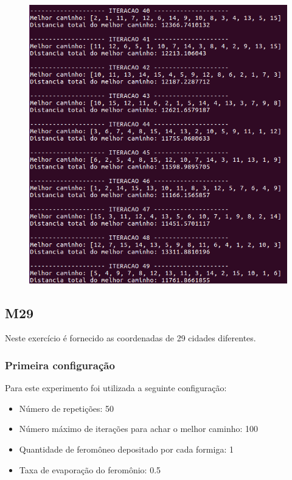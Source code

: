 \documentclass[hidelinks,12pt]{article}
\begin{document}
		\newpage
		
		\begin{figure}[!h]
			\centering
			\includegraphics[scale=0.6]{Figures/m15-2-5.png}
		\end{figure}

		\newpage	

	\subsection{M29}
			Neste exercício é fornecido as coordenadas de 29 cidades diferentes.	
		\subsubsection{Primeira configuração}
		 	Para este experimento foi utilizada a seguinte configuração:

		 	\begin{itemize}
				\item Número de repetições: 50
				\item Número máximo de iterações para achar o melhor caminho: 100
				\item Quantidade de feromôneo depositado por cada formiga: 1
				\item Taxa de evaporação do feromônio: 0.5
			\end{itemize}
\end{document}
